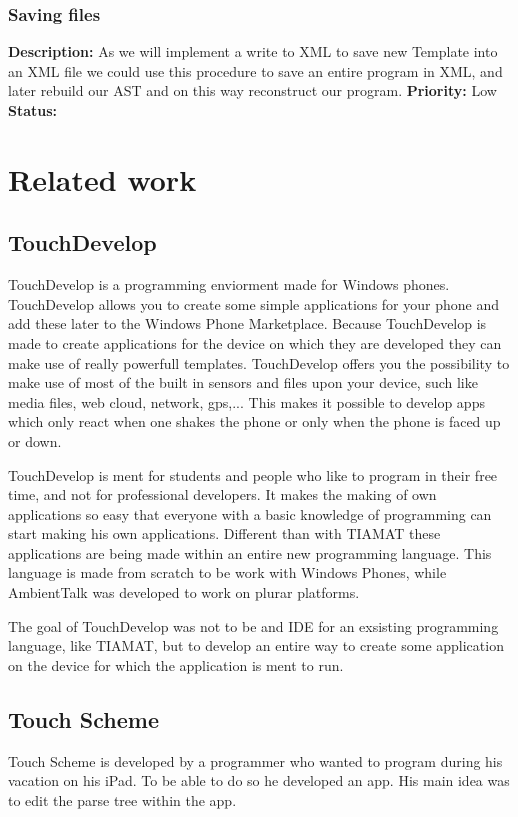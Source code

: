 \documentclass[a4paper,12pt]{report}
\begin{document}
\subsection{Saving files}
\textbf{Description: } As we will implement a write to XML to save new Template into an XML file we could use this procedure to save an entire program in XML, and later rebuild our AST and on this way 
reconstruct our program. \newline
\textbf{Priority:} Low \newline
\textbf{Status: }
\chapter{Related work}
\section{TouchDevelop}
TouchDevelop is a programming enviorment made for Windows phones. TouchDevelop allows you to create some simple applications for your phone and add these later to the Windows Phone Marketplace. 
Because TouchDevelop is made to create applications for the device on which they are developed they can make use of really powerfull templates. TouchDevelop offers you the possibility to make use 
of most of the built in sensors and files upon your device, such like media files, web cloud, network, gps,... This makes it possible to develop apps which only react when one shakes the phone or
only when the phone is faced up or down.

TouchDevelop is ment for students and people who like to program in their free time, and not for professional developers. It makes the making of own applications so easy that everyone with a 
basic knowledge of programming can start making his own applications. Different than with TIAMAT these applications are being made within an entire new programming language. This language
is made from scratch to be work with Windows Phones, while AmbientTalk was developed to work on plurar platforms.

The goal of TouchDevelop was not to be and IDE for an exsisting programming language, like TIAMAT, but to develop an entire way to create some application on the device for which the application
is ment to run.  
\section{Touch Scheme}
Touch Scheme is developed by a programmer who wanted to program during his vacation on his iPad. To be able to do so he developed an app. His main idea was to edit the parse tree within the app.
\end{document}
